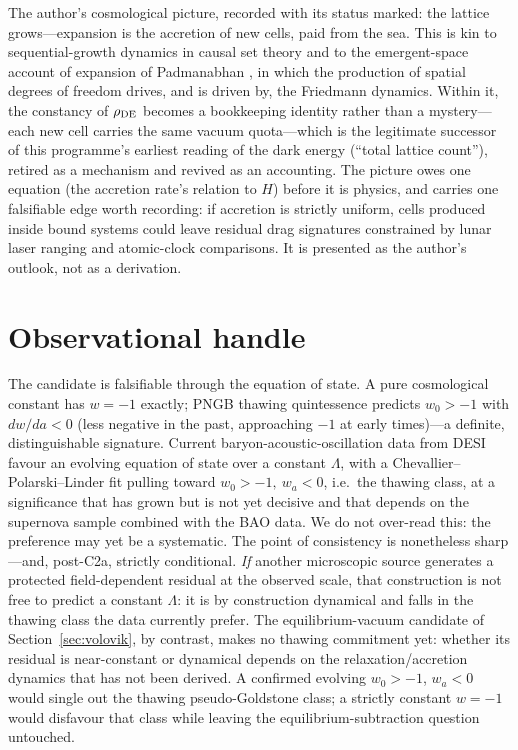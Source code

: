 \documentclass[11pt]{article}
\begin{document}
The author's cosmological picture, recorded with its status marked:
the lattice grows---expansion is the accretion of new cells, paid
from the sea.  This is kin to sequential-growth dynamics in causal
set theory \cite{Sorkin:2003bx} and to the emergent-space account of
expansion of Padmanabhan \cite{Padmanabhan:2012ik}, in which the
production of spatial degrees of freedom drives, and is driven by,
the Friedmann dynamics.  Within it, the constancy of
$\rho_{\rm DE}$ becomes a bookkeeping identity rather than a
mystery---each new cell carries the same vacuum quota---which is the
legitimate successor of this programme's earliest reading of the
dark energy (``total lattice count''), retired as a mechanism and
revived as an accounting.  The picture owes one equation (the
accretion rate's relation to $H$) before it is physics, and carries
one falsifiable edge worth recording: if accretion is strictly
uniform, cells produced inside bound systems could leave residual
drag signatures constrained by lunar laser ranging and atomic-clock
comparisons.  It is presented as the author's outlook, not as a
derivation.

\section{Observational handle}
\label{sec:obs}

The candidate is falsifiable through the equation of state.  A pure
cosmological constant has $w = -1$ exactly; PNGB thawing quintessence
predicts $w_0 > -1$ with $dw/da < 0$ (less negative in the past,
approaching $-1$ at early times)---a definite, distinguishable
signature.  Current baryon-acoustic-oscillation data from DESI
\cite{DESI:2024} favour an evolving equation of state over a constant
$\Lambda$, with a Chevallier--Polarski--Linder fit pulling toward
$w_0 > -1,\ w_a < 0$, i.e.\ the thawing class, at a significance that
has grown but is not yet decisive and that depends on the supernova
sample combined with the BAO data.  We do not over-read this: the
preference may yet be a systematic.  The point of consistency is
nonetheless sharp---and, post-C2a, strictly conditional.  \emph{If}
another microscopic source generates a protected field-dependent
residual at the observed scale, that construction is not free to
predict a constant $\Lambda$: it is by construction dynamical and
falls in the thawing class the data currently prefer.  The
equilibrium-vacuum candidate of Section~\ref{sec:volovik}, by
contrast, makes no thawing commitment yet: whether its residual is
near-constant or dynamical depends on the relaxation/accretion
dynamics that has not been derived.  A confirmed evolving
$w_0 > -1$, $w_a < 0$ would single out the thawing pseudo-Goldstone
class; a strictly constant $w = -1$ would disfavour that class while
leaving the equilibrium-subtraction question untouched.
\end{document}
